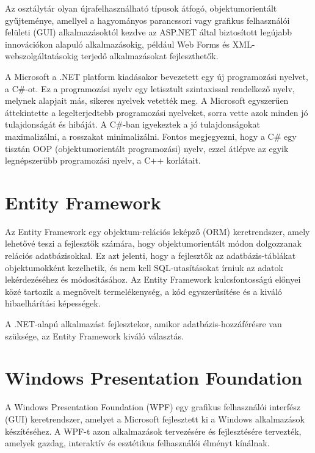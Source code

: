 \documentclass[
]{thesis-ekf}
\theoremstyle{definition}
\theoremstyle{remark}
\begin{document}
Az osztálytár olyan újrafelhasználható típusok átfogó, objektumorientált gyűjteménye, amellyel a hagyományos parancssori vagy grafikus felhasználói felületi (GUI) alkalmazásoktól kezdve az ASP.NET által biztosított legújabb innovációkon alapuló alkalmazásokig, például Web Forms és XML-webszolgáltatásokig terjedő alkalmazásokat fejleszthetők.

A Microsoft a .NET platform kiadásakor bevezetett egy új programozási nyelvet, a C\#-ot. Ez a programozási nyelv egy letisztult szintaxissal rendelkező nyelv, melynek alapjait más, sikeres nyelvek vetették meg. A Microsoft egyszerűen áttekintette a legelterjedtebb programozási nyelveket, sorra vette azok minden jó tulajdonságát és hibáját. A C\#-ban igyekeztek a jó tulajdonságokat maximalizálni, a rosszakat minimalizálni. Fontos megjegyezni, hogy a C\# egy tisztán OOP (objektumorientált programozási) nyelv, ezzel átlépve az egyik legnépszerűbb programozási nyelv, a C++ korlátait.
\section{Entity Framework}
Az Entity Framework egy objektum-relációs leképző (ORM) keretrendszer, amely lehetővé teszi a fejlesztők számára, hogy objektumorientált módon dolgozzanak relációs adatbázisokkal. Ez azt jelenti, hogy a fejlesztők az adatbázis-táblákat objektumokként kezelhetik, és nem kell SQL-utasításokat írniuk az adatok lekérdezéséhez és módosításához. Az Entity Framework kulcsfontosságú előnyei közé tartozik a megnövelt termelékenység, a kód egyszerűsítése és a kiváló hibaelhárítási képességek. 

A .NET-alapú alkalmazást fejlesztekor, amikor adatbázis-hozzáférésre van szüksége, az Entity Framework kiváló választás.
\section{Windows Presentation Foundation}
A Windows Presentation Foundation (WPF) egy grafikus felhasználói interfész (GUI) keretrendszer, amelyet a Microsoft fejlesztett ki a Windows alkalmazások készítéséhez. A WPF-t azon alkalmazások tervezésére és fejlesztésére tervezték, amelyek gazdag, interaktív és esztétikus felhasználói élményt kínálnak. 
\end{document}
